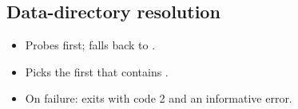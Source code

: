 \subsection{Data-directory resolution}

\begin{itemize}
  \item Probes  first; falls back to
        .
  \item Picks the first that contains .
  \item On failure: exits with code 2 and an informative error.
\end{itemize}
